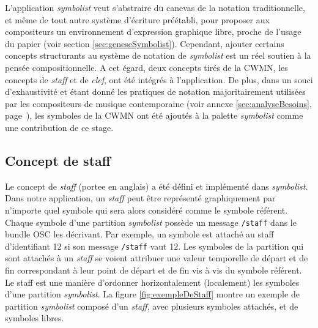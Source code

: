 L'application \textit{symbolist} veut s'abstraire du canevas de la notation traditionnelle, et même de tout autre système d'écriture préétabli, pour proposer aux compositeurs un environnement d'expression graphique libre, proche de l'usage du papier (voir section \ref{sec:geneseSymbolist}).
Cependant, ajouter certains concepts structurants au système de notation de \textit{symbolist} est un réel soutien à la pensée compositionnelle. A cet égard, deux concepts tirés de la CWMN, les concepts de \textit{staff} et de \textit{clef}, ont été intégrés à l'application. 
De plus, dans un souci d'exhaustivité et étant donné les pratiques de notation majoritairement utilisées par les compositeurs de musique contemporaine (voir annexe \ref{sec:analyseBesoins}, page~\pageref{sec:analyseBesoins}), les symboles de la CWMN ont été ajoutés à la palette \textit{symbolist} comme une contribution de ce stage.

\subsection{Concept de staff} 
\label{subsec:conceptDeStaff}
Le concept de \textit{staff} (\gls{portee} en anglais) a été défini et implémenté dans \textit{symbolist}.
Dans notre application, un \textit{staff} peut être représenté graphiquement par n'importe quel symbole qui sera alors considéré comme le symbole référent. Chaque symbole d'une partition \textit{symbolist} possède un message \texttt{/staff} dans le bundle OSC les décrivant. Par exemple, un symbole est attaché au staff d'identifiant 12 si son message \texttt{/staff} vaut 12.
Les symboles de la partition qui sont attachés à un \textit{staff} se voient attribuer une valeur temporelle de départ et de fin correspondant à leur point de départ et de fin vis à vis du symbole référent.
Le staff est une manière d'ordonner horizontalement (localement) les symboles d'une partition \textit{symbolist}. 
La figure \ref{fig:exempleDeStaff} montre un exemple de partition \textit{symbolist} composé d'un \textit{staff}, avec plusieurs symboles attachés, et de symboles libres.


